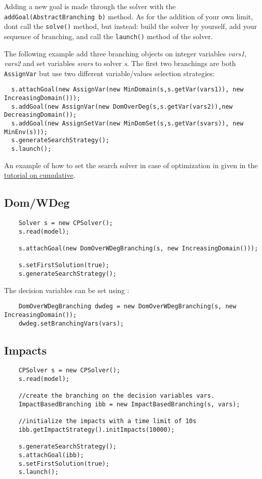 Adding a new goal is made through the solver with the \texttt{addGoal(AbstractBranching b)} method. As for the addition of your own limit, dont call the \texttt{solve()} method, but instead: build the solver by yourself, add your sequence of branching, and call the \texttt{launch()} method of the solver. 

The following example add three branching objects on integer variables \emph{vars1}, \emph{vars2} and set variables \emph{svars} to solver \emph{s}. The first two branchings are both \texttt{AssignVar} but use two different variable/values selection strategies:
\begin{lstlisting}
  s.attachGoal(new AssignVar(new MinDomain(s,s.getVar(vars1)), new IncreasingDomain()));
  s.addGoal(new AssignVar(new DomOverDeg(s,s.getVar(vars2)),new DecreasingDomain());
  s.addGoal(new AssignSetVar(new MinDomSet(s,s.getVar(svars)), new MinEnv(s)));
  s.generateSearchStrategy();
  s.launch();
\end{lstlisting}

An example of how to set the search solver in case of optimization in given in the \hyperlink{schedulinganduseofthecumulative:schedulinganduseofthecumulativeconstraint}{tutorial on cumulative}.

\subsection{Dom/WDeg}\label{solver:dom/wdeg}\hypertarget{solver:dom/wdeg}{}
\begin{lstlisting}
	Solver s = new CPSolver();
	s.read(model);
	    
	s.attachGoal(new DomOverWDegBranching(s, new IncreasingDomain()));
	    
	s.setFirstSolution(true);
	s.generateSearchStrategy();
\end{lstlisting}

The decision variables can be set using :
\begin{lstlisting}
	DomOverWDegBranching dwdeg = new DomOverWDegBranching(s, new IncreasingDomain());
	dwdeg.setBranchingVars(vars);
\end{lstlisting}

\subsection{Impacts}\label{solver:impacts}\hypertarget{solver:impacts}{}
\begin{lstlisting}
	CPSolver s = new CPSolver();
	s.read(model);
	
	//create the branching on the decision variables vars.
	ImpactBasedBranching ibb = new ImpactBasedBranching(s, vars);
	
	//initialize the impacts with a time limit of 10s 
	ibb.getImpactStrategy().initImpacts(10000);
	
	s.generateSearchStrategy();
	s.attachGoal(ibb);
	s.setFirstSolution(true);
	s.launch();
\end{lstlisting}

